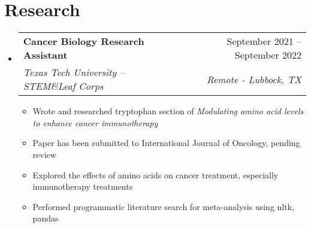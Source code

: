 \documentclass[letterpaper,11pt]{article}
\makeatletter
\newcommand{\resumeItem}[1]{
  \item\small{
    {#1 \vspace{-2pt}}
  }
}
\newcommand{\resumeSubheading}[4]{
  \vspace{-2pt}\item
    \begin{tabular*}{0.97\textwidth}[t]{l@{\extracolsep{\fill}}r}
      \textbf{#1} & #2 \\
      \textit{\small#3} & \textit{\small #4} \\
    \end{tabular*}\vspace{-7pt}
}
\newcommand{\resumeSubHeadingListStart}{\begin{itemize}[leftmargin=0.15in, label={}]}
\newcommand{\resumeSubHeadingListEnd}{\end{itemize}}
\newcommand{\resumeItemListStart}{\begin{itemize}}
\newcommand{\resumeItemListEnd}{\end{itemize}\vspace{-5pt}}
\makeatother
\begin{document}

\section{Research}
 \resumeSubHeadingListStart
  \resumeSubheading{Cancer Biology Research Assistant}{September 2021 -- September 2022}{Texas Tech University -- STEM\&Leaf Corps}{Remote - Lubbock, TX}
    \resumeItemListStart
        \resumeItem{Wrote and researched tryptophan section of \textit{Modulating amino acid levels to enhance cancer immunotherapy}}
        \resumeItem{Paper has been submitted to International Journal of Oncology, pending review}
        \resumeItem{Explored the effects of amino acids on cancer treatment, especially immunotherapy treatments}
        \resumeItem{Performed programmatic literature search for meta-analysis using nltk, pandas}
    \resumeItemListEnd
 \resumeSubHeadingListEnd

\end{document}
